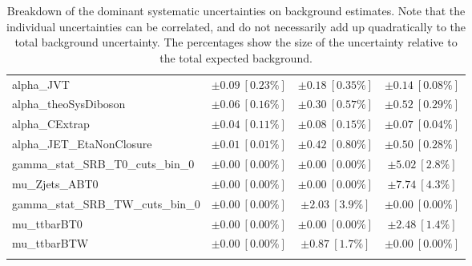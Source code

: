 \begin{table}
\begin{center}
\begin{tabular*}{\textwidth}{@{\extracolsep{\fill}}lccc}
alpha\_JVT         & $\pm 0.09\ [0.23\%] $          & $\pm 0.18\ [0.35\%] $          & $\pm 0.14\ [0.08\%] $       \\
alpha\_theoSysDiboson         & $\pm 0.06\ [0.16\%] $          & $\pm 0.30\ [0.57\%] $          & $\pm 0.52\ [0.29\%] $       \\
alpha\_CExtrap         & $\pm 0.04\ [0.11\%] $          & $\pm 0.08\ [0.15\%] $          & $\pm 0.07\ [0.04\%] $       \\
alpha\_JET\_EtaNonClosure         & $\pm 0.01\ [0.01\%] $          & $\pm 0.42\ [0.80\%] $          & $\pm 0.50\ [0.28\%] $       \\
gamma\_stat\_SRB\_T0\_cuts\_bin\_0         & $\pm 0.00\ [0.00\%] $          & $\pm 0.00\ [0.00\%] $          & $\pm 5.02\ [2.8\%] $       \\
mu\_Zjets\_ABT0         & $\pm 0.00\ [0.00\%] $          & $\pm 0.00\ [0.00\%] $          & $\pm 7.74\ [4.3\%] $       \\
gamma\_stat\_SRB\_TW\_cuts\_bin\_0         & $\pm 0.00\ [0.00\%] $          & $\pm 2.03\ [3.9\%] $          & $\pm 0.00\ [0.00\%] $       \\
mu\_ttbarBT0         & $\pm 0.00\ [0.00\%] $          & $\pm 0.00\ [0.00\%] $          & $\pm 2.48\ [1.4\%] $       \\
mu\_ttbarBTW         & $\pm 0.00\ [0.00\%] $          & $\pm 0.87\ [1.7\%] $          & $\pm 0.00\ [0.00\%] $       \\
\noalign{\smallskip}\hline\noalign{\smallskip}
\end{tabular*}
\end{center}
\caption[Breakdown of uncertainty on background estimates]{
Breakdown of the dominant systematic uncertainties on background estimates.
Note that the individual uncertainties can be correlated, and do not necessarily add up quadratically to 
the total background uncertainty. The percentages show the size of the uncertainty relative to the total expected background.
\label{table.results.bkgestimate.uncertainties.SRB_TT_SRB_TW_SRB_T0}}
\end{table}
%